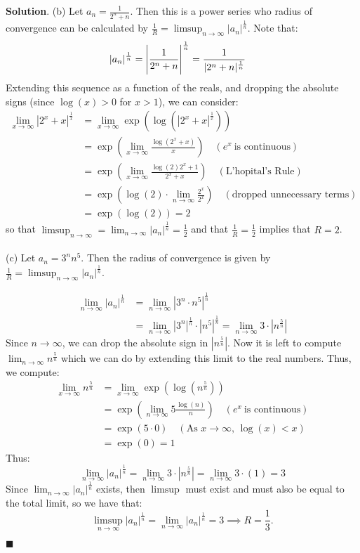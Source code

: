 \documentclass[12pt]{article}
\renewcommand{\=}[1]{\stackrel{#1}{=}} %
\theoremstyle{definition}
\newenvironment{s}{%
        \begin{trivlist} \item \textbf{Solution}. }{%
            \hspace*{\fill} $\blacksquare$\end{trivlist}}%
\begin{document}
\begin{s}
    (b) Let $a_n = \frac{1}{2^n + n}$. Then this is a power series who radius of convergence can be calculated by
    $\frac{1}{R} = \limsup_{n\to\infty}|a_n|^{\frac{1}{n}}$. Note that:
    \begin{align*}
        |a_n|^{\frac{1}{n}} &= \Bigg{|}\frac{1}{2^n+n}\Bigg{|}^{\frac{1}{n}} = \frac{1}{|2^n+n|^{\frac{1}{n}}}
    \end{align*}
    Extending this sequence as a function of the reals, and dropping the absolute signs (since $\log(x) > 0$ for $x > 1$), we can consider:
    \begin{align*}
        \lim_{x\to\infty} |2^x+x|^{\frac{1}{x}} &= \lim_{x\to\infty} \exp(\log(|2^x+x|^{\frac{1}{x}})) \\
        &= \exp(\lim_{x\to\infty} \frac{\log(2^x+x)}{x})\quad(e^x\:\text{is continuous}) \\
        &= \exp(\lim_{x\to\infty} \frac{\log(2)2^x+1}{2^x+x})\quad(\text{L'hopital's Rule}) \\
        &= \exp(\log(2)\cdot\lim_{n\to\infty}\frac{2^x}{2^x})\quad(\text{dropped unnecessary terms})\\
        &= \exp(\log(2)) = 2
    \end{align*}
    so that $\limsup_{n\to\infty} = \lim_{n\to\infty} |a_n|^{\frac{1}{n}} = \frac{1}{2}$ and that $\frac{1}{R} = \frac{1}{2}$
    implies that $R = 2$. \\ \\

    (c) Let $a_n = 3^nn^5$. Then the radius of convergence is given by $\frac{1}{R} = \limsup_{n\to\infty} |a_n|^{\frac{1}{n}}$.

    \begin{align*}
        \lim_{n\to\infty}|a_n|^{\frac{1}{n}} &= \lim_{n\to\infty} |3^n\cdot n^5|^{\frac{1}{n}} \\
        &= \lim_{n\to\infty}|3^n|^{\frac{1}{n}}\cdot |n^5|^{\frac{1}{n}} = \lim_{n\to\infty} 3\cdot |n^\frac{5}{n}|
    \end{align*}
    Since $n\to\infty$, we can drop the absolute sign in $|n^{\frac{5}{n}}|$. Now it is left to compute
    $\lim_{n\to\infty}n^{\frac{5}{n}}$ which we can do by extending this limit to the real numbers. Thus, we compute:
    \begin{align*}
        \lim_{x\to\infty} n^{\frac{5}{n}} &= \lim_{x\to\infty} \exp(\log(n^{\frac{5}{n}})) \\
        &= \exp(\lim_{n\to\infty}5\frac{\log(n)}{n})\quad(e^x\:\text{is continuous})\\
        &= \exp(5\cdot0)\quad(\text{As $x\to\infty$, $\log(x) < x$}) \\
        &= \exp(0) = 1
    \end{align*}
    Thus:
    \[ \lim_{n\to\infty} |a_n|^{\frac{1}{n}} = \lim_{n\to\infty} 3\cdot|n^{\frac{5}{n}}| = \lim_{n\to\infty} 3\cdot (1) = 3 \]
    Since $\lim_{n\to\infty}|a_n|^{\frac{1}{n}}$ exists, then $\limsup$ must exist and must also be equal to the total limit, so we have that:
    \[ \limsup_{n\to\infty} |a_n|^{\frac{1}{n}} = \lim_{n\to\infty} |a_n|^{\frac{1}{n}} = 3 \implies R = \frac{1}{3}. \]


\end{s}
\end{document}
